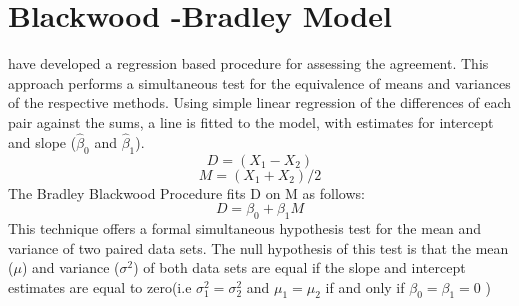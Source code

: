 \documentclass[12pt, a4paper]{report}
\theoremstyle{plain}
\theoremstyle{definition}
\theoremstyle{remark}
\begin{document}
	
	\section{Blackwood -Bradley Model} 
	
	\citet{BB89} have developed a regression based procedure for
	assessing the agreement. This approach performs a simultaneous test for the equivalence of
	means and variances of the respective methods. Using simple linear
	regression of the differences of each pair against the sums, a
	line is fitted to the model, with estimates for intercept and
	slope ($\hat{\beta}_{0}$ and $\hat{\beta}_{1}$).
	\begin{equation}
		D = (X_{1}-X_{2})
	\end{equation}
	\begin{equation}
		M = (X_{1} + X_{2}) /2
	\end{equation}
	The Bradley Blackwood Procedure fits D on M as follows:\\
	\begin{equation}
		D = \beta_{0} + \beta_{1}M
	\end{equation}
	This technique offers a formal simultaneous hypothesis test for the
	mean and variance of two paired data sets.  The null
	hypothesis of this test is that the mean ($\mu$) and variance
	($\sigma^{2}$) of both data sets are equal if the slope and
	intercept estimates are equal to zero(i.e $\sigma^{2}_{1} =
	\sigma^{2}_{2}$ and $\mu_{1}=\mu_{2}$ if and only if $\beta_{0}=
	\beta_{1}=0$ )
	
\end{document}
